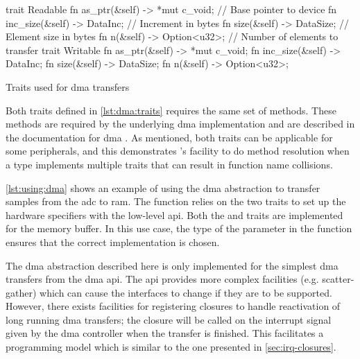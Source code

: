 \begin{listing}[H]
  \begin{rustcode}
trait Readable {
  fn as_ptr(&self) -> *mut c_void; // Base pointer to device
  fn inc_size(&self) -> DataInc;   // Increment in bytes
  fn size(&self) -> DataSize;      // Element size in bytes
  fn n(&self) -> Option<u32>;      // Number of elements to transfer
}
trait Writable {
  fn as_ptr(&self) -> *mut c_void;
  fn inc_size(&self) -> DataInc;
  fn size(&self) -> DataSize;
  fn n(&self) -> Option<u32>;
}
  \end{rustcode}
  \caption{Traits used for \gls{dma} transfers}
  \label{lst:dma:traits}
\end{listing}

Both traits defined in \autoref{lst:dma:traits} requires the same set of methods.
These methods are required by the underlying \gls{dma} implementation and are described in the {\emlib} documentation for \gls{dma} \cite{Dma2004}.
As mentioned, both traits can be applicable for some peripherals, and this demonstrates {\rust}'s facility to do method resolution when a type implements multiple traits that can result in function name collisions.

\autoref{lst:using:dma} shows an example of using the \gls{dma} abstraction to transfer samples from the \gls{adc} to \gls{ram}.
The  function relies on the two traits to set up the hardware specifiers with the low-level \gls{api}.
Both the  and  traits are implemented for the memory buffer.
In this use case, the type of the  parameter in the  function ensures that the correct implementation is chosen.

The \gls{dma} abstraction described here is only implemented for the simplest \gls{dma} transfers from the {\emlib} \gls{dma} \gls{api}.
The {\emlib} \gls{api} provides more complex facilities (e.g. scatter-gather) which can cause the interfaces to change if they are to be supported.
However, there exists facilities for registering closures to handle reactivation of long running \gls{dma} transfers; the closure will be called on the interrupt signal given by the \gls{dma} controller when the transfer is finished.
This facilitates a programming model which is similar to the one presented in \autoref{sec:irq-closures}.

